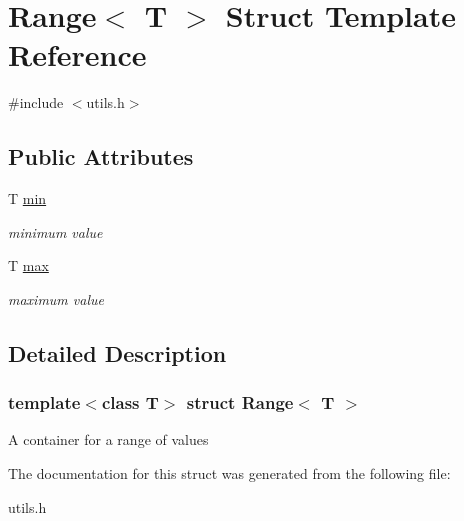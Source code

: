 \hypertarget{structRange}{
\section{Range$<$ T $>$ Struct Template Reference}
\label{structRange}
}


{\ttfamily \#include $<$utils.h$>$}

\subsection*{Public Attributes}
\begin{DoxyCompactItemize}
\item 
\hypertarget{structRange_ab931e1f11f92c147bca1dfe7555b159d}{
T \hyperlink{structRange_ab931e1f11f92c147bca1dfe7555b159d}{min}}
\label{structRange_ab931e1f11f92c147bca1dfe7555b159d}

\begin{DoxyCompactList}\small\item\em minimum value \item\end{DoxyCompactList}\item 
\hypertarget{structRange_ab9f49430e13b2acc6f1a51b25b6d875a}{
T \hyperlink{structRange_ab9f49430e13b2acc6f1a51b25b6d875a}{max}}
\label{structRange_ab9f49430e13b2acc6f1a51b25b6d875a}

\begin{DoxyCompactList}\small\item\em maximum value \item\end{DoxyCompactList}\end{DoxyCompactItemize}


\subsection{Detailed Description}
\subsubsection*{template$<$class T$>$ struct Range$<$ T $>$}

A container for a range of values 

The documentation for this struct was generated from the following file:\begin{DoxyCompactItemize}
\item 
utils.h\end{DoxyCompactItemize}
